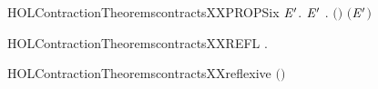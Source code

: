 \newcommand{\HOLContractionTheoremscontractsXXPRESDXXBYXXPAR}{\UseVerbatim{HOLContractionTheoremscontractsXXPRESDXXBYXXPAR}}
\begin{SaveVerbatim}{HOLContractionTheoremscontractsXXPROPSix}
\HOLTokenTurnstile{} \HOLSymConst{\HOLTokenForall{}} \ensuremath{\HOLBoundVar{E}\sp{\prime}}.   \ensuremath{\HOLBoundVar{E}\sp{\prime}} \HOLSymConst{\HOLTokenImp{}} \HOLSymConst{\HOLTokenForall{}}.  \ensuremath{(}\HOLSymConst{\ensuremath{\ldotp}}\ensuremath{)} \ensuremath{(}\HOLSymConst{\ensuremath{\ldotp}}\ensuremath{\HOLBoundVar{E}\sp{\prime}}\ensuremath{)}
\end{SaveVerbatim}
\newcommand{\HOLContractionTheoremscontractsXXPROPSix}{\UseVerbatim{HOLContractionTheoremscontractsXXPROPSix}}
\begin{SaveVerbatim}{HOLContractionTheoremscontractsXXREFL}
\HOLTokenTurnstile{} \HOLSymConst{\HOLTokenForall{}}.   
\end{SaveVerbatim}
\newcommand{\HOLContractionTheoremscontractsXXREFL}{\UseVerbatim{HOLContractionTheoremscontractsXXREFL}}
\begin{SaveVerbatim}{HOLContractionTheoremscontractsXXreflexive}
\HOLTokenTurnstile{}  \ensuremath{(}\ensuremath{)}
\end{SaveVerbatim}
\newcommand{\HOLContractionTheoremscontractsXXreflexive}{\UseVerbatim{HOLContractionTheoremscontractsXXreflexive}}
